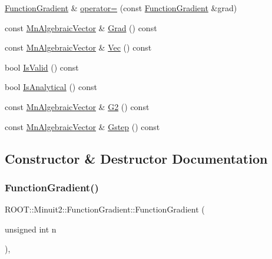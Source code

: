 \begin{DoxyCompactItemize}
\item 
\mbox{\hyperlink{classROOT_1_1Minuit2_1_1FunctionGradient}{Function\+Gradient}} \& \mbox{\hyperlink{classROOT_1_1Minuit2_1_1FunctionGradient_a0b85ff1f65dbefea4c3953898efb06ec}{operator=}} (const \mbox{\hyperlink{classROOT_1_1Minuit2_1_1FunctionGradient}{Function\+Gradient}} \&grad)
\item 
const \mbox{\hyperlink{namespaceROOT_1_1Minuit2_a62ed97730a1ca8d3fbaec64a19aa11c9}{Mn\+Algebraic\+Vector}} \& \mbox{\hyperlink{classROOT_1_1Minuit2_1_1FunctionGradient_a0effb8dbe0115928f72f122621ba4ad3}{Grad}} () const
\item 
const \mbox{\hyperlink{namespaceROOT_1_1Minuit2_a62ed97730a1ca8d3fbaec64a19aa11c9}{Mn\+Algebraic\+Vector}} \& \mbox{\hyperlink{classROOT_1_1Minuit2_1_1FunctionGradient_abdf0fd7d9e1a730049112f0c903a9f5f}{Vec}} () const
\item 
bool \mbox{\hyperlink{classROOT_1_1Minuit2_1_1FunctionGradient_a441801769f9021ade74b724584731791}{Is\+Valid}} () const
\item 
bool \mbox{\hyperlink{classROOT_1_1Minuit2_1_1FunctionGradient_a34dd6c6a7d699a149edfbb3328c525db}{Is\+Analytical}} () const
\item 
const \mbox{\hyperlink{namespaceROOT_1_1Minuit2_a62ed97730a1ca8d3fbaec64a19aa11c9}{Mn\+Algebraic\+Vector}} \& \mbox{\hyperlink{classROOT_1_1Minuit2_1_1FunctionGradient_a6f99988a7fd1a61ed96c6709f02b6041}{G2}} () const
\item 
const \mbox{\hyperlink{namespaceROOT_1_1Minuit2_a62ed97730a1ca8d3fbaec64a19aa11c9}{Mn\+Algebraic\+Vector}} \& \mbox{\hyperlink{classROOT_1_1Minuit2_1_1FunctionGradient_a09cf6f34997cef2cffca0d9ccc2b36b8}{Gstep}} () const
\end{DoxyCompactItemize}


\subsection{Constructor \& Destructor Documentation}
\mbox{\label{classROOT_1_1Minuit2_1_1FunctionGradient_ae2e6c3f8011dbe5aaf75c8e41b7de9b5}} 
\subsubsection{\texorpdfstring{FunctionGradient()}{FunctionGradient()}\hspace{0.1cm}{\footnotesize\ttfamily [1/8]}}
{\footnotesize\ttfamily R\+O\+O\+T\+::\+Minuit2\+::\+Function\+Gradient\+::\+Function\+Gradient (\begin{DoxyParamCaption}\item[{unsigned int}]{n }\end{DoxyParamCaption})\hspace{0.3cm}{\ttfamily [inline]}, {\ttfamily [explicit]}}

